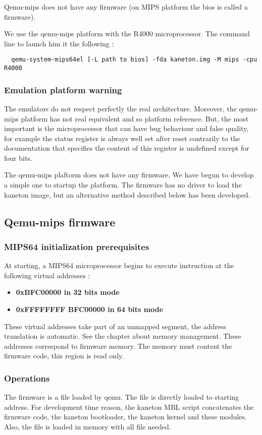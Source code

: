 Qemu-mips does not have any firmware (on MIPS platform the bios is called a firmware).

We use the qemu-mips platform with the R4000 microprocessor. The command line to launch him it the following :

\begin{verbatim}
  qemu-system-mips64el [-L path to bios] -fda kaneton.img -M mips -cpu R4000
\end{verbatim}

\subsubsection{Emulation platform warning}

The emulators do not respect perfectly the real architecture. Moreover, the qemu-mips platform has not
real equivalent and so platform reference. But, the most important is the microprocessor that can have bug behaviour
and false quality, for example the status register is always well set after reset contrarily to the documentation that specifies the content of this register is undefined except for four bits.

The qemu-mips plaftorm does not have any firmware. We have begun to develop a simple one to startup the platform. The firmware has no driver to load the kaneton image, but an alternative method described below has been developed.

\subsection{Qemu-mips firmware}

\subsubsection{MIPS64 initialization prerequisites}

At starting, a MIPS64 microprocessor begins to execute instruction at the following virtual addresses :

\begin{itemize}
  \item
    \textbf{0xBFC00000 in 32 bits mode}
  \item
    \textbf{0xFFFFFFFF BFC00000 in 64 bits mode}
\end{itemize}

These virtual addresses take part of an unmapped segment, the address translation is automatic. See the chapter about memory management. These addresses correspond to firmware memory. The memory must content the firmware code, this region is read only.

\subsubsection{Operations}

The firmware is a file loaded by qemu. The file is directly loaded to starting address. For development time reason, the kaneton MBL script concatenates the firmware code, the kaneton bootloader, the kaneton kernel and these modules. Also, the file is loaded in memory with all file needed.

